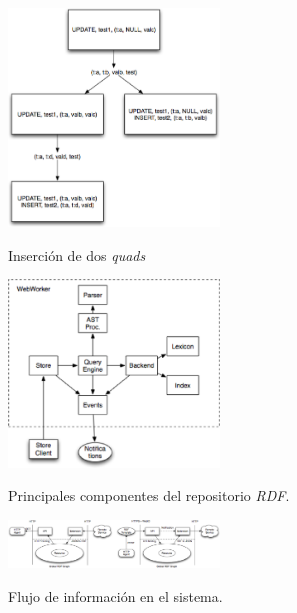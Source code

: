 \vspace*{-3in}

\begin{figure}
\vspace{2.4in}
\caption{Inserci\'on de dos \textit{quads}}
\includegraphics[width=0.5\textwidth]{figura3}
\label{figura3}
\end{figure}

\clearpage
\newpage

\vspace*{-3in}

\begin{figure}
\vspace{2.4in}
\caption{Principales componentes del repositorio \textit{RDF}.}
\includegraphics[width=0.5\textwidth]{figura4}
\label{figura4}
\end{figure}

\clearpage
\newpage

\vspace*{-3in}

\begin{figure}
\vspace{2.4in}
\caption{Flujo de informaci\'on en el sistema.}
\includegraphics[width=0.5\textwidth]{figura5}
\label{figura5}
\end{figure}

